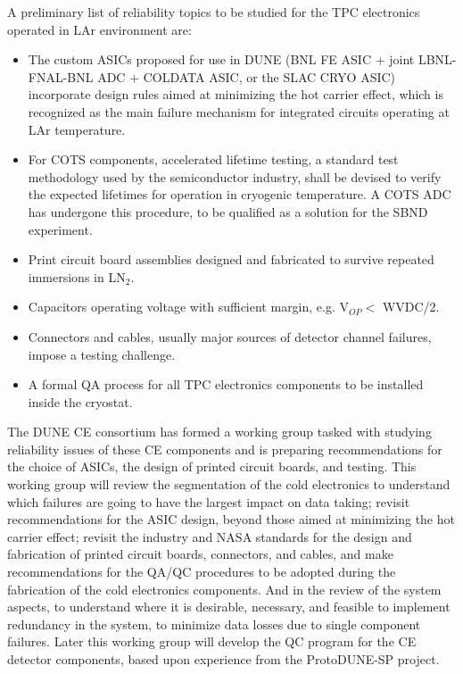 A preliminary list of reliability topics to be studied for the TPC electronics operated in LAr environment are:
\begin{itemize}
	\item The custom ASICs proposed for use in DUNE (BNL FE ASIC + joint LBNL-FNAL-BNL ADC + COLDATA ASIC, or the SLAC CRYO ASIC) incorporate design rules aimed at minimizing the hot carrier effect\cite{Li:2013ieee}\cite{Hoff:2015hax}, which is recognized as the main failure mechanism for integrated circuits operating at LAr temperature.
	\item For COTS components, accelerated lifetime testing, a standard test methodology used by the semiconductor industry, shall be devised to verify the expected lifetimes for operation in cryogenic temperature. A COTS ADC has undergone this procedure, to be qualified as a solution for the SBND experiment\cite{Chen:2018zic}.
	\item Print circuit board assemblies designed and fabricated to survive repeated immersions in LN$_2$.
	\item Capacitors operating voltage with sufficient margin, e.g. V$_{OP}<$ WVDC/2.
	\item Connectors and cables, usually major sources of detector channel failures, impose a testing challenge.
	\item A formal QA process for all TPC electronics components to be installed inside the cryostat.
\end{itemize}
The DUNE CE consortium has formed a working group tasked with studying reliability issues of these CE components and is preparing recommendations for the choice of ASICs, the design of printed circuit boards, and testing. This working group will review the segmentation of the cold electronics to understand which failures are going to have the largest impact on data taking; revisit recommendations for the ASIC design, beyond those aimed at minimizing the hot carrier effect; revisit the industry and NASA standards for the design and fabrication of printed circuit boards, connectors, and cables, and make recommendations for the QA/QC procedures to be adopted during the fabrication of the cold electronics components. And in the review of the system aspects, to understand where it is desirable, necessary, and feasible to implement redundancy in the system, to minimize data losses due to single component failures. Later this working group will develop the QC program for the CE detector components, based upon experience from the ProtoDUNE-SP project.
